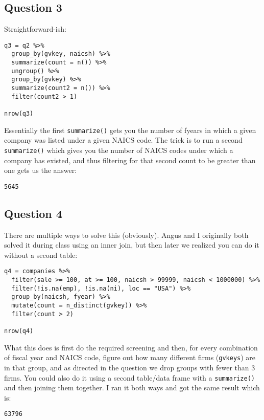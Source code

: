 \documentclass[11pt]{article}
\begin{document}
\subsection*{Question 3}
\label{sec:orgd1b06eb}
Straightforward-ish:

\begin{verbatim}
q3 = q2 %>%
  group_by(gvkey, naicsh) %>%
  summarize(count = n()) %>%
  ungroup() %>%
  group_by(gvkey) %>%
  summarize(count2 = n()) %>%
  filter(count2 > 1)

nrow(q3)
\end{verbatim}

Essentially the first \texttt{summarize()} gets you the number of fyears in which a given company was listed under a given NAICS code.  The trick is to run a second \texttt{summarize()} which gives you the number of NAICS codes under which a company has existed, and thus filtering for that second count to be greater than one gets us the answer:

\begin{verbatim}
5645
\end{verbatim}

\subsection*{Question 4}
\label{sec:org03b47c8}
There are multiple ways to solve this (obviously).  Angus and I originally both solved it during class using an inner join, but then later we realized you can do it without a second table:

\begin{verbatim}
q4 = companies %>%
  filter(sale >= 100, at >= 100, naicsh > 99999, naicsh < 1000000) %>%
  filter(!is.na(emp), !is.na(ni), loc == "USA") %>%
  group_by(naicsh, fyear) %>%
  mutate(count = n_distinct(gvkey)) %>%
  filter(count > 2)

nrow(q4)
\end{verbatim}

What this does is first do the required screening and then, for every combination of fiscal year and NAICS code, figure out how many different firms (\texttt{gvkeys}) are in that group, and as directed in the question we drop groups with fewer than 3 firms.  You could also do it using a second table/data frame with a \texttt{summarize()} and then joining them together.  I ran it both ways and got the same result which is:

\begin{verbatim}
63796
\end{verbatim}
\end{document}

